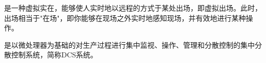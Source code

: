 \item [远程呈现(telepresence)] 是一种虚拟实在，能够使人实时地以远程的方式于某处出场，即虚拟出场。此时，出场相当于"在场"，即你能够在现场之外实时地感知现场，并有效地进行某种操作。

\item [集散控制系统(Distributed control system)] 是以微处理器为基础的对生产过程进行集中监视、操作、管理和分散控制的集中分散控制系统，简称DCS系统。
